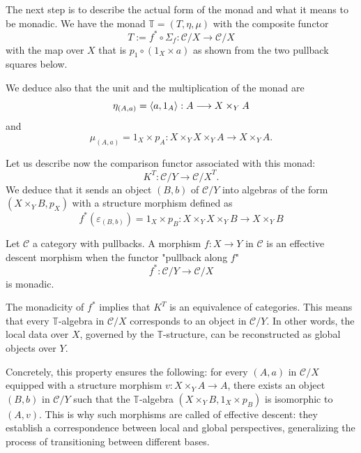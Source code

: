 The next step is to describe the actual form of the monad and what it means to be monadic. We have the monad $\mathbb{T} = (T, \eta, \mu)$ with the composite functor
\[ T:= f^*\circ\Sigma_f: \mathcal{C}/X\longrightarrow\mathcal{C}/X \]
with the map over $X$ that is $p_1\circ (1_X\times a)$ as shown from the two pullback squares below.
\begin{center}
\end{center}
We deduce also that the unit and the multiplication of the monad are
\[ \eta_{(A,a)}=\langle{a},{1_A}\rangle: A\longrightarrow X\times_YA \]
and
\[ \mu_{(A,a)}=1_X\times p_A: X\times_YX\times_YA \longrightarrow X\times_YA. \]

Let us describe now the comparison functor associated with this monad:
\[ K^T:\mathcal{C}/Y\longrightarrow {\mathcal{C}/X}^T. \]
We deduce that it sends an object $(B,b)$ of $\mathcal{C}/Y$ into algebras of the form $(X\times_YB,p_X)$ with a structure morphism defined as
\[f^*(\varepsilon_{(B,b)}) = 1_X\times p_B:X\times_YX\times_YB\longrightarrow X\times_YB\]

\begin{definition}
    Let $\mathcal{C}$ a category with pullbacks. A morphism $f:X\to Y$ in $\mathcal{C}$ is an effective descent morphism when the functor "pullback along $f$"
    \[ f^*:\mathcal{C}/Y\longrightarrow\mathcal{C}/X \]
    is monadic.
\end{definition}

The monadicity of $f^*$ implies that $K^T$ is an equivalence of categories. This means that every $\mathbb{T}$-algebra in $\mathcal{C}/X$ corresponds to an object in $\mathcal{C}/Y$. In other words, the local data over $X$, governed by the $\mathbb{T}$-structure, can be reconstructed as global objects over $Y$.

Concretely, this property ensures the following: for every $(A,a)$ in $\mathcal{C}/X$ equipped with a structure morphism $v:X\times_YA\to A$, there exists an object $(B,b)$ in $\mathcal{C}/Y$ such that the $\mathbb{T}$-algebra $(X\times_YB, 1_X\times p_B)$ is isomorphic to $(A,v)$. This is why such morphisms are called of effective descent: they establish a correspondence between local and global perspectives, generalizing the process of transitioning between different bases.


